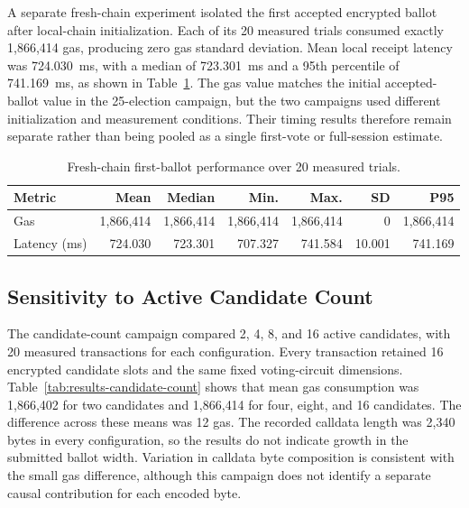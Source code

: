 A separate fresh-chain experiment isolated the first accepted encrypted ballot after local-chain initialization. Each of its 20 measured trials consumed exactly 1,866,414 gas, producing zero gas standard deviation. Mean local receipt latency was 724.030~ms, with a median of 723.301~ms and a 95th percentile of 741.169~ms, as shown in Table~\ref{tab:results-fresh-chain}. The gas value matches the initial accepted-ballot value in the 25-election campaign, but the two campaigns used different initialization and measurement conditions. Their timing results therefore remain separate rather than being pooled as a single first-vote or full-session estimate.
\label{subsec:results-fresh-chain}

\begin{table}[t]
\centering
\caption{Fresh-chain first-ballot performance
over 20 measured trials.}
\label{tab:results-fresh-chain}
\scriptsize
\setlength{\tabcolsep}{3pt}
\begin{tabular}{@{}lrrrrrr@{}}
\toprule
\textbf{Metric} &
\textbf{Mean} &
\textbf{Median} &
\textbf{Min.} &
\textbf{Max.} &
\textbf{SD} &
\textbf{P95} \\
\midrule
Gas
& 1,866,414
& 1,866,414
& 1,866,414
& 1,866,414
& 0
& 1,866,414 \\
Latency (ms)
& 724.030
& 723.301
& 707.327
& 741.584
& 10.001
& 741.169 \\
\bottomrule
\end{tabular}
\end{table}

\subsection{Sensitivity to Active Candidate Count}
\label{subsec:results-candidate-count}

The candidate-count campaign compared 2, 4, 8, and 16 active candidates, with 20 measured transactions for each configuration. Every transaction retained 16 encrypted candidate slots and the same fixed voting-circuit dimensions. Table~\ref{tab:results-candidate-count} shows that mean gas consumption was 1,866,402 for two candidates and 1,866,414 for four, eight, and 16 candidates. The difference across these means was 12 gas. The recorded calldata length was 2,340 bytes in every configuration, so the results do not indicate growth in the submitted ballot width. Variation in calldata byte composition is consistent with the small gas difference, although this campaign does not identify a separate causal contribution for each encoded byte.


